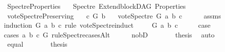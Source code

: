 %
\begin{isabellebody}%
%
%
\isadelimtheory
%
\endisadelimtheory
%
\isatagtheory
{}\isamarkupfalse%
\ Spectre{\isacharunderscore}{\kern0pt}Properties\isanewline
\ \ \ Spectre\ Extend{\isacharunderscore}{\kern0pt}blockDAG\ Properties\isanewline
{}%
\endisatagtheory
{\isafoldtheory}%
%
\isadelimtheory
%
\endisadelimtheory
%
\isadelimdocument
%
\endisadelimdocument
%
\isatagdocument
%
\isamarkuptrue%
%
\isamarkuptrue%
%
\endisatagdocument
{\isafolddocument}%
%
\isadelimdocument
%
\endisadelimdocument
{}\isamarkupfalse%
\ vote{\isacharunderscore}{\kern0pt}Spectre{\isacharunderscore}{\kern0pt}Preserving{\isacharcolon}{\kern0pt}\isanewline
\ \ \ {\isachardoublequoteopen}c\ {\isasymrightarrow}\isactrlsup {\isacharplus}{\kern0pt}\isactrlbsub G\isactrlesub \ b{\isachardoublequoteclose}\isanewline
\ \ \ {\isachardoublequoteopen}vote{\isacharunderscore}{\kern0pt}Spectre\ G\ a\ b\ c\ {\isasymin}\ {\isacharbraceleft}{\kern0pt}{}{\isacharcomma}{\kern0pt}{}{\isacharbraceright}{\kern0pt}{\isachardoublequoteclose}\isanewline
%
\isadelimproof
\ \ %
\endisadelimproof
%
\isatagproof
{}\isamarkupfalse%
\ assms\isanewline
{}\isamarkupfalse%
{\isacharparenleft}{\kern0pt}induction\ G\ a\ b\ c\ rule{\isacharcolon}{\kern0pt}\ vote{\isacharunderscore}{\kern0pt}Spectre{\isachardot}{\kern0pt}induct{\isacharparenright}{\kern0pt}\isanewline
\ \ \isamarkupfalse%
\ {\isacharparenleft}{\kern0pt}{}\ G\ a\ b\ c{\isacharparenright}{\kern0pt}\isanewline
\ \ \isamarkupfalse%
\ \isamarkupfalse%
\ {\isacharquery}{\kern0pt}case\ \isanewline
\ \ \isamarkupfalse%
{\isacharparenleft}{\kern0pt}cases\ a\ b\ c\ G\ rule{\isacharcolon}{\kern0pt}Spectre{\isacharunderscore}{\kern0pt}casesAlt{\isacharparenright}{\kern0pt}\isanewline
\ \ \ \ \isamarkupfalse%
\ no{\isacharunderscore}{\kern0pt}bD\isanewline
\ \ \ \ \isamarkupfalse%
\ \isamarkupfalse%
\ {\isacharquery}{\kern0pt}thesis\ \isamarkupfalse%
\ auto\isanewline
\ \ \isamarkupfalse%
\isanewline
\ \ \ \ \isamarkupfalse%
\ equal\isanewline
\ \ \ \ \isamarkupfalse%
\ \isamarkupfalse%
\ {\isacharquery}{\kern0pt}thesis\ \ \isamarkupfalse%

\end{isabellebody}
